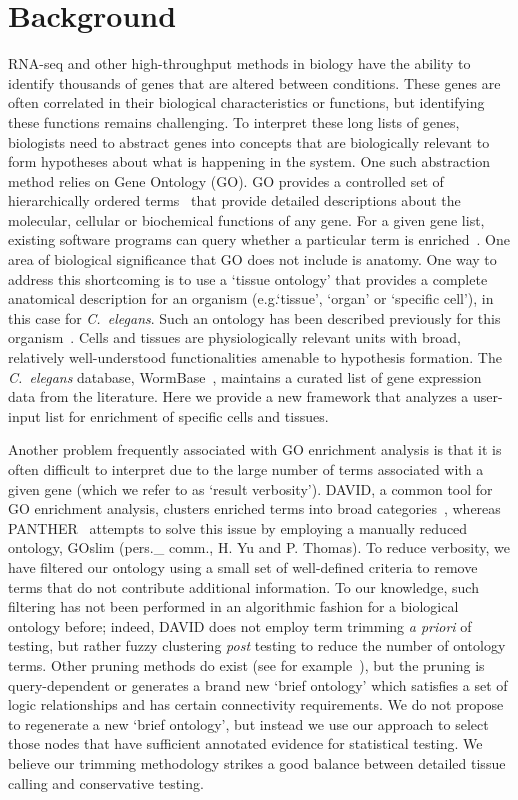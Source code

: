 \section*{Background}
	RNA-seq and other high-throughput methods in biology have the ability to
  identify thousands of genes that are altered between conditions. These genes
  are often correlated in their biological characteristics or functions, but
  identifying these functions remains challenging. To interpret these long lists
  of genes, biologists need to abstract genes into concepts that are biologically
  relevant to form hypotheses about what is happening in the system. One such
  abstraction method relies on Gene Ontology (GO). GO provides a controlled set
  of hierarchically ordered terms~\citep{TheGeneOntologyConsortium2000a,
  TheGeneOntologyConsortium2015} that provide detailed descriptions about the
  molecular, cellular or biochemical functions of any gene. For a given gene
  list, existing software programs can query whether a particular term is
  enriched~\citep{Mi2009, McLean2010, Huang2009, Pathan2015}. One area of
  biological significance that GO does not include is anatomy. One way to
  address this shortcoming is to use a `tissue ontology' that provides a
  complete anatomical description for an organism (e.g.`tissue', `organ' or
  `specific cell'), in this case for \emph{C.~elegans}. Such an ontology has
  been described previously for this organism~\citep{Lee2003}. Cells and tissues
  are physiologically relevant units with broad, relatively well-understood
  functionalities amenable to hypothesis formation. The \emph{C.~elegans}
  database, WormBase~\citep{Howe2016}, maintains a curated list of gene expression
  data from the literature. Here we provide a new framework that analyzes a
  user-input list for enrichment of specific cells and tissues.

Another problem frequently associated with GO enrichment analysis is that it
is often difficult to interpret due to the large number of terms associated with
a given gene (which we refer to as `result verbosity'). DAVID, a common tool for
GO enrichment analysis, clusters enriched terms into broad
categories~\citep{Huang2007}, whereas PANTHER~\citep{Mi2009, Mi2013} attempts to
solve this issue by employing a manually reduced ontology, GOslim (pers.\_ comm.,
H. Yu and P. Thomas). To reduce verbosity, we have filtered our ontology using
a small set of well-defined criteria to remove terms that do not contribute
additional information. To our knowledge, such filtering has not been performed
in an algorithmic fashion for a biological ontology before; indeed, DAVID does
not employ term trimming \emph{a priori} of testing, but rather fuzzy clustering
\emph{post} testing to reduce the number of ontology terms. Other pruning methods
do exist (see for example~\citep{Kim2007, Garrido2012}), but the pruning is
query-dependent or generates a brand new `brief ontology' which satisfies a set
of logic relationships and has certain connectivity requirements. We do not
propose to regenerate a new `brief ontology', but instead we use our approach
to select those nodes that have sufficient annotated evidence for statistical
testing. We believe our trimming methodology strikes a good balance between
detailed tissue calling and conservative testing.

